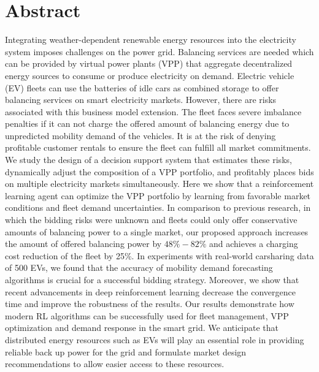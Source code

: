 \thispagestyle{empty}
\vspace*{\fill}

\section*{Abstract}
Integrating weather-dependent renewable energy resources into the electricity
system imposes challenges on the power grid. Balancing services are needed which
can be provided by virtual power plants (VPP) that aggregate decentralized
energy sources to consume or produce electricity on demand. Electric vehicle
(EV) fleets can use the batteries of idle cars as combined storage to offer
balancing services on smart electricity markets. However, there are risks
associated with this business model extension. The fleet faces severe imbalance
penalties if it can not charge the offered amount of balancing energy due to
unpredicted mobility demand of the vehicles. It is at the risk of denying
profitable customer rentals to ensure the fleet can fulfill all market
commitments. We study the design of a decision support system that estimates
these risks, dynamically adjust the composition of a VPP portfolio, and
profitably places bids on multiple electricity markets simultaneously. Here we
show that a reinforcement learning agent can optimize the VPP portfolio by
learning from favorable market conditions and fleet demand uncertainties. In
comparison to previous research, in which the bidding risks were unknown and
fleets could only offer conservative amounts of balancing power to a single
market, our proposed approach increases the amount of offered balancing power by
$48\% - 82\%$  and achieves a charging cost reduction of the fleet by 25\%. In
experiments with real-world carsharing data of 500 EVs, we found that the
accuracy of mobility demand forecasting algorithms is crucial for a successful
bidding strategy. Moreover, we show that recent advancements in deep
reinforcement learning decrease the convergence time and improve the robustness
of the results. Our results demonstrate how modern RL algorithms can be
successfully used for fleet management, VPP optimization and demand response in
the smart grid. We anticipate that distributed energy resources such as EVs will
play an essential role in providing reliable back up power for the grid and
formulate market design recommendations to allow easier access to these
resources.

\vspace*{\fill}
\clearpage
